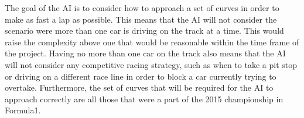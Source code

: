 The goal of the AI is to consider how to approach a set of curves in order to make as fast a lap as possible. This means that the AI will not consider the scenario were more than one car is driving on the track at a time. This would raise the complexity above one that would be reasonable within the time frame of the project. Having no more than one car on the track also means that the AI will not consider any competitive racing strategy, such as when to take a pit stop or driving on a different race line in order to block a car currently trying to overtake. Furthermore, the set of curves that will be required for the AI to approach correctly are all those that were a part of the 2015 championship in Formula1.

\iffalse
Key points:

Background
- Racing problem
  - car has momentum and limited manoeuvrability
  - tactical
  - sequence of actions, done with precision
- Using machine learning with little knowledge of the domain.
- Many techniques not feasible
  - discuss

Purpose 
- The exploration of NEAT in context of the racing problem. How it may be used and what role it may have.
- Discuss what it could mean to machine learning in general.

Limitation
- Complexity of the environment
- Replicating conceptual similarities of the racing behaviour such as: reasonable positioning, maximising speed where possible, taking curves... 
- One car, not the interaction between cars in a racing setting.
\fi
